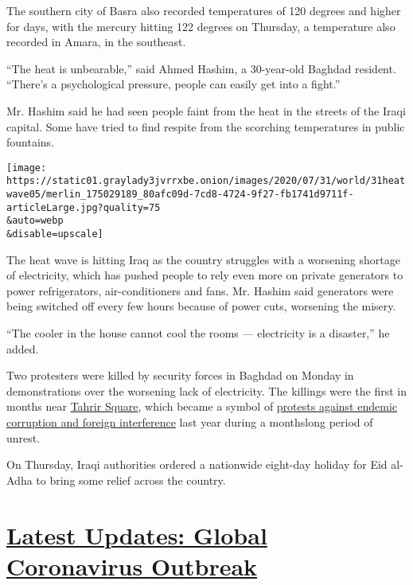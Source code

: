 The southern city of Basra also recorded temperatures of 120 degrees and
higher for days, with the mercury hitting 122 degrees on Thursday, a
temperature also recorded in Amara, in the southeast.

``The heat is unbearable,'' said Ahmed Hashim, a 30-year-old Baghdad
resident. ``There's a psychological pressure, people can easily get into
a fight.''

Mr. Hashim said he had seen people faint from the heat in the streets of
the Iraqi capital. Some have tried to find respite from the scorching
temperatures in public fountains.

\texttt{[image: https://static01.graylady3jvrrxbe.onion/images/2020/07/31/world/31heatwave05/merlin\_175029189\_80afc09d-7cd8-4724-9f27-fb1741d9711f-articleLarge.jpg?quality=75\\\&auto=webp\\\&disable=upscale]}

The heat wave is hitting Iraq as the country struggles with a worsening
shortage of electricity, which has pushed people to rely even more on
private generators to power refrigerators, air-conditioners and fans.
Mr. Hashim said generators were being switched off every few hours
because of power cuts, worsening the misery.

``The cooler in the house cannot cool the rooms --- electricity is a
disaster,'' he added.

Two protesters were killed by security forces in Baghdad on Monday in
demonstrations over the worsening lack of electricity. The killings were
the first in months near
\href{https://www.nytimes3xbfgragh.onion/2019/11/20/world/middleeast/iraq-protests-sadr-city.html}{Tahrir
Square}, which became a symbol of
\href{https://www.nytimes3xbfgragh.onion/2019/12/21/world/middleeast/Iraq-protests-Iran.html}{protests
against endemic corruption and foreign interference} last year during a
monthslong period of unrest.

On Thursday, Iraqi authorities ordered a nationwide eight-day holiday
for Eid al-Adha to bring some relief across the country.

\hypertarget{latest-updates-global-coronavirus-outbreak}{%
\section{\texorpdfstring{\href{https://www.nytimes3xbfgragh.onion/2020/08/04/world/coronavirus-covid-19.html?action=click\&pgtype=Article\&state=default\&region=MAIN_CONTENT_1\&context=storylines_live_updates}{Latest
Updates: Global Coronavirus
Outbreak}}{Latest Updates: Global Coronavirus Outbreak}}\label{latest-updates-global-coronavirus-outbreak}}

